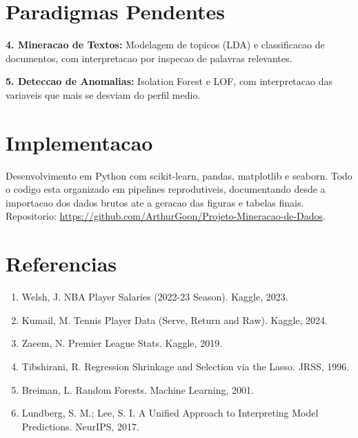 \documentclass[10pt,a4paper]{article}
\begin{document}
\section*{Paradigmas Pendentes}

\textbf{4. Mineracao de Textos:} Modelagem de topicos (LDA) e classificacao de documentos, com interpretacao por inspecao de palavras relevantes.

\textbf{5. Deteccao de Anomalias:} Isolation Forest e LOF, com interpretacao das variaveis que mais se desviam do perfil medio.

\section*{Implementacao}

Desenvolvimento em Python com scikit-learn, pandas, matplotlib e seaborn. Todo o codigo esta organizado em pipelines reprodutiveis, documentando desde a importacao dos dados brutos ate a geracao das figuras e tabelas finais. Repositorio: \url{https://github.com/ArthurGoon/Projeto-Mineracao-de-Dados}.

\section*{Referencias}

\begin{enumerate}
    \setlength{\itemsep}{0pt}
    \setlength{\parsep}{0pt}
    \item Welsh, J. NBA Player Salaries (2022-23 Season). Kaggle, 2023.
    \item Kumail, M. Tennis Player Data (Serve, Return and Raw). Kaggle, 2024.
    \item Zaeem, N. Premier League Stats. Kaggle, 2019.
    \item Tibshirani, R. Regression Shrinkage and Selection via the Lasso. JRSS, 1996.
    \item Breiman, L. Random Forests. Machine Learning, 2001.
    \item Lundberg, S. M.; Lee, S. I. A Unified Approach to Interpreting Model Predictions. NeurIPS, 2017.
\end{enumerate}
\end{document}
